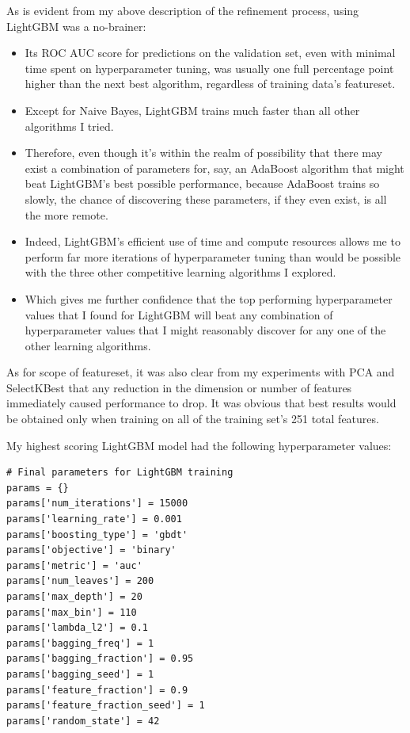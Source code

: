 \documentclass[12pt, letterpaper]{article}
\begin{document}
As is evident from my above description of the refinement process, using LightGBM was a no-brainer:
\begin{itemize}
  \item Its ROC AUC score for predictions on the validation set, even with minimal time spent on hyperparameter tuning, was usually one full percentage point higher than the next best algorithm, regardless of training data's featureset.
  \item Except for Naive Bayes, LightGBM trains much faster than all other algorithms I tried.
  \item Therefore, even though it's within the realm of possibility that there may exist a combination of parameters for, say, an AdaBoost algorithm that might beat LightGBM's best possible performance, because AdaBoost trains so slowly, the chance of discovering these parameters, if they even exist, is all the more remote.
  \item Indeed, LightGBM's efficient use of time and compute resources allows me to perform far more iterations of hyperparameter tuning than would be possible with the three other competitive learning algorithms I explored.
  \item Which gives me further confidence that the top performing hyperparameter values that I found for LightGBM will beat any combination of hyperparameter values that I might reasonably discover for any one of the other learning algorithms.
\end{itemize}

As for scope of featureset, it was also clear from my experiments with PCA and SelectKBest that any reduction in the dimension or number of features immediately caused performance to drop. It was obvious that best results would be obtained only when training on all of the training set's 251 total features.

My highest scoring LightGBM model had the following hyperparameter values:

\begin{lstlisting}
# Final parameters for LightGBM training
params = {}
params['num_iterations'] = 15000
params['learning_rate'] = 0.001
params['boosting_type'] = 'gbdt'
params['objective'] = 'binary'
params['metric'] = 'auc'
params['num_leaves'] = 200
params['max_depth'] = 20
params['max_bin'] = 110
params['lambda_l2'] = 0.1
params['bagging_freq'] = 1
params['bagging_fraction'] = 0.95
params['bagging_seed'] = 1
params['feature_fraction'] = 0.9
params['feature_fraction_seed'] = 1
params['random_state'] = 42
\end{lstlisting}
\end{document}
